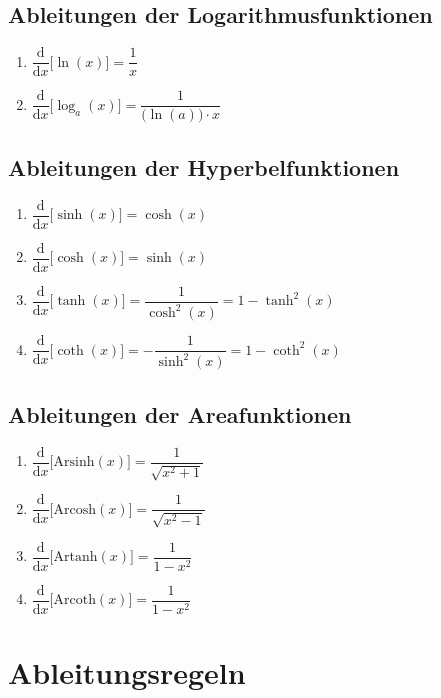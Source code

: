 \subsection{Ableitungen der Logarithmusfunktionen}
\begin{enumerate}[$(a)$]
\item $\dfrac{\text{d}}{\text{d}x}\Big[\ln\left(x\right)\Big]=\dfrac{1}{x}$
\item $\dfrac{\text{d}}{\text{d}x}\Big[\log_a\left(x\right)\Big]=\dfrac{1}{\Big(\ln\left(a\right)\Big)\cdot x}$
\end{enumerate}
\subsection{Ableitungen der Hyperbelfunktionen}
\begin{enumerate}[$(a)$]
\item $\dfrac{\text{d}}{\text{d}x}\Big[\sinh\left(x\right)\Big]=\cosh\left(x\right)$
\item $\dfrac{\text{d}}{\text{d}x}\Big[\cosh\left(x\right)\Big]=\sinh\left(x\right)$
\item $\dfrac{\text{d}}{\text{d}x}\Big[\tanh\left(x\right)\Big]=\dfrac{1}{\cosh^2\left(x\right)}=1-\tanh^2\left(x\right)$
\item $\dfrac{\text{d}}{\text{d}x}\Big[\coth\left(x\right)\Big]=-\dfrac{1}{\sinh^2\left(x\right)}=1-\coth^2\left(x\right)$
\end{enumerate}
\subsection{Ableitungen der Areafunktionen}
\begin{enumerate}[$(a)$]
\item $\dfrac{\text{d}}{\text{d}x}\Big[\text{Arsinh}\left(x\right)\Big]=\dfrac{1}{\sqrt{x^2+1}}$
\item $\dfrac{\text{d}}{\text{d}x}\Big[\text{Arcosh}\left(x\right)\Big]=\dfrac{1}{\sqrt{x^2-1}}$
\item $\dfrac{\text{d}}{\text{d}x}\Big[\text{Artanh}\left(x\right)\Big]=\dfrac{1}{1-x^2}$
\item $\dfrac{\text{d}}{\text{d}x}\Big[\text{Arcoth}\left(x\right)\Big]=\dfrac{1}{1-x^2}$
\end{enumerate}
\section{Ableitungsregeln}
